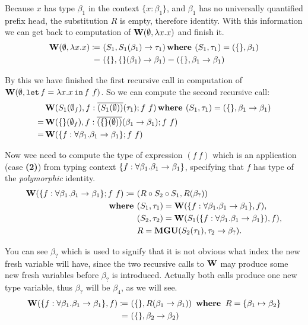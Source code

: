 \documentclass[a4paper,oneside]{memoir}
\begin{document}
Because $x$ has type $\beta_1$ in the context $\{x : \beta_1\}$, and $\beta_1$ has no universally quantified prefix head, the substitution $R$ is empty, therefore identity. With this information we can get back to computation of $\operatorname{\textbf{W}}(\emptyset, \lambda x .x)$ and finish it. 
\begin{align*}
\operatorname{\textbf{W}}(\emptyset, \lambda x . x) \coloneqq ~ & (S_1, S_1(\beta_1) \rightarrow \tau_1 ) \operatorname{\textbf{where~}} (S_1, \tau_1) = ( \{\}, \beta_1 ) \\
 = ~ & (\{\}, \{\}(\beta_1) \rightarrow \beta_1 ) = (\{\}, \beta_1 \rightarrow \beta_1 )
\end{align*}

By this we have finished the first recursive call in computation of \\
$\operatorname{\textbf{W}}(\emptyset, \texttt{let} \, f = \lambda x . x \, \texttt{in} \, f~f)$. So we can compute the second recursive call:
\begin{align*}
& \operatorname{\textbf{W}}(S_1(\emptyset_f),f:\overline{(S_1(\emptyset))}(\tau_1); f~f) \operatorname{\textbf{where~}} (S_1, \tau_1) = (\{\}, \beta_1 \rightarrow \beta_1 ) \\
= & \operatorname{\textbf{W}}(\{\}(\emptyset_f),f:\overline{(\{\}(\emptyset))}(\beta_1 \rightarrow \beta_1); f~f) \\
= & \operatorname{\textbf{W}}(\{f:\forall \beta_1 . \beta_1 \rightarrow \beta_1 \}; f~f)
\end{align*}

Now wee need to compute the type of expression $(f~f)$ which is an application (case \textbf{(2)}) from typing context $\{f:\forall \beta_1 . \beta_1 \rightarrow \beta_1 \}$, specifying that $f$ has type of the \textit{polymorphic} identity. 
\begin{align*}
\operatorname{\textbf{W}}(\{f:\forall \beta_1 . \beta_1 \rightarrow \beta_1 \}; f~f) \coloneqq ~ & 
(R \circ S_2 \circ S_1, R(\beta_?) ) \\
\operatorname{\textbf{where~}} & (S_1, \tau_1) = \operatorname{\textbf{W}}(\{f:\forall \beta_1 . \beta_1 \rightarrow \beta_1 \}, f), \\
       & (S_2, \tau_2) = \operatorname{\textbf{W}}(S_1(\{f:\forall \beta_1 . \beta_1 \rightarrow \beta_1 \}), f), \\
       & R = \operatorname{\textbf{MGU}}( S_2(\tau_1), \tau_2 \rightarrow \beta_? ).\\
\end{align*}

You can see $\beta_?$ which is used to signify that it is not obvious what index the new fresh variable will have, since the two recursive calls to $\operatorname{\textbf{W}}$ may produce some new fresh variables before $\beta_?$ is introduced. Actually both calls produce one new type variable, thus $\beta_?$ will be $\beta_4$, as we will see.
\begin{align*}
\operatorname{\textbf{W}}(\{f:\forall \beta_1 . \beta_1 \rightarrow \beta_1 \}, f) \coloneqq ~ & (\{\}, R(\beta_1 \rightarrow \beta_1) ) 
~ \operatorname{\textbf{where~}} R = \{\beta_1 \mapsto \beta_2\} \\
= ~ &  (\{\}, \beta_2 \rightarrow \beta_2)
\end{align*}
\end{document}
